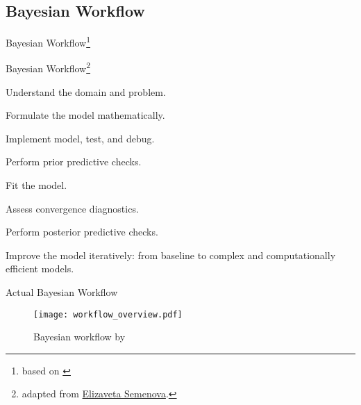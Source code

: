 \subsection{Bayesian Workflow}
\begin{frame}{Bayesian Workflow\footnote{based on \textcite{gelmanBayesianWorkflow2020}}}
	\centering
\end{frame}

\begin{frame}{Bayesian Workflow\footnote{
			adapted from \href{https://github.com/elizavetasemenova}
			{Elizaveta Semenova}.}}
	\begin{vfilleditems}
		\item Understand the domain and problem.
		\item Formulate the model mathematically.
		\item Implement model, test, and debug.
		\item Perform prior predictive checks.
		\item Fit the model.
		\item Assess convergence diagnostics.
		\item Perform posterior predictive checks.
		\item Improve the model iteratively: from baseline to complex and computationally efficient models.
	\end{vfilleditems}

\end{frame}

\begin{frame}{Actual Bayesian Workflow}
	\centering
	\begin{figure}
		\texttt{[image: workflow\_overview.pdf]}
		\caption{Bayesian workflow by \textcite{gelmanBayesianWorkflow2020}}
	\end{figure}
\end{frame}

